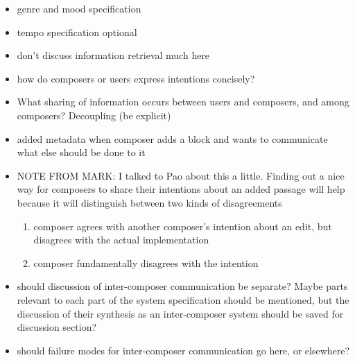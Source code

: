 \documentclass[final,authoryear,5p,times,twocolumn]{elsarticle}
\begin{document}
 
 \begin{itemize}
 
 \item genre and mood specification
 
 \item tempo specification optional
 
 \item don't discuss information retrieval much here
 
 \item how do composers or users express intentions concisely?
 
 \item What sharing of information occurs between users and composers, and among composers? Decoupling (be explicit)
 
 \item added metadata when composer adds a block and wants to communicate what else should be done to it
 
\item NOTE FROM MARK: I talked to Pao about this a little. Finding out a nice way for composers to share their intentions about an added passage will help because it will distinguish between two kinds of disagreements
\begin{enumerate}
\item composer agrees with another composer's intention about an edit, but disagrees with the actual implementation
\item composer fundamentally disagrees with the intention
\end{enumerate}

 \item should discussion of inter-composer communication be separate? Maybe parts relevant to each part of the system specification should be mentioned, but the discussion of their synthesis as an inter-composer system should be saved for discussion section?
 
 \item should failure modes for inter-composer communication go here, or elsewhere?
 
 \end{itemize}
\end{document}

